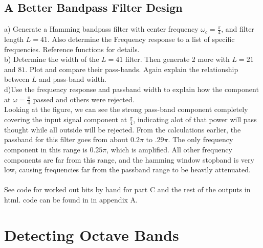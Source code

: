 \documentclass[a4paper, 11pt]{exam}
\begin{document}
\subsection{A Better Bandpass Filter Design}
a) Generate a Hamming bandpass filter with center frequency $\omega_c = \frac{\pi}{4}$, and filter length $L = 41$. Also determine the Frequency response to a list of specific frequencies. Reference functions for details.\\
b) Determine the width of the $L = 41$ filter. Then generate 2 more with $L = 21$ and $81$. Plot and compare their pass-bands. Again explain the relationship between $L$ and pass-band width.\\
d)Use the frequency response and passband width to explain how the component at $\omega = \frac{\pi}{4}$ passed and others were rejected.\\
Looking at the figure, we can see the strong pass-band component completely covering the input signal component at $\frac{\pi}{4}$, indicating alot of that power will pass thought while all outside will be rejected. From the calculations earlier, the passband for this filter goes from about $0.2\pi$ to $.29\pi$. The only frequency component in this range is $0.25\pi$, which is amplified. All other frequency components are far from this range, and the hamming window stopband is very low, causing frequencies far from the passband range to be heavily attenuated.\\\\
See code for worked out bits by hand for part C and the rest of the outputs in html. code can be found in in appendix A.
\section{Detecting Octave Bands}
\end{document}
